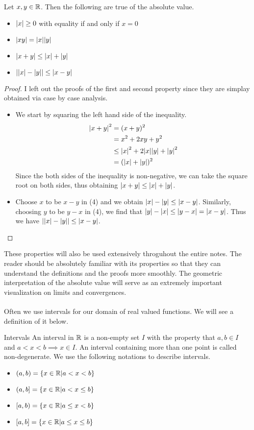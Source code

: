 \documentclass[a4paper]{article}
\begin{document}
\begin{prp}{}{} Let $x,y\in\mathbb{R}$. Then the following are true of the absolute value. 
\begin{itemize}
\item $\abs{x}\geq 0$ with equality if and only if $x=0$
\item $\abs{xy}=\abs{x}\abs{y}$
\item $\abs{x+y}\leq\abs{x}+\abs{y}$
\item $\abs{\abs{x}-\abs{y}}\leq\abs{x-y}$
\end{itemize}\tcbline
\begin{proof} I left out the proofs of the first and second property since they are simplay obtained via case by case analysis. 
\begin{itemize}
\item We start by squaring the left hand side of the inequality. 
\begin{align*}
\abs{x+y}^2&=(x+y)^2 \\
&=x^2+2xy+y^2 \\
&\leq \abs{x}^2+2\abs{x}\abs{y}+\abs{y}^2 \\
&=(\abs{x}+\abs{y})^2
\end{align*}
Since the both sides of the inequality is non-negative, we can take the square root on both sides, thus obtaining $\abs{x+y}\leq\abs{x}+\abs{y}$. 
\item Choose $x$ to be $x-y$ in (4) and we obtain $\abs{x}-\abs{y}\leq\abs{x-y}$. Similarly, choosing $y$ to be $y-x$ in (4), we find that $\abs{y}-\abs{x}\leq\abs{y-x}=\abs{x-y}$. Thus we have $\abs{\abs{x}-\abs{y}}\leq\abs{x-y}$. 
\end{itemize}
\end{proof}
\end{prp}

These properties will also be used extensively throguhout the entire notes. The reader should be absolutely familiar with its properties so that they can understand the definitions and the proofs more smoothly. The geometric interpretation of the absolute value will serve as an extremely important visualization on limits and convergences. \\~\\

Often we use intervals for our domain of real valued functions. We will see a definition of it below. 

\begin{defn}{Intervals}{} An interval in $\mathbb{R}$ is a non-empty set $I$ with the property that $a,b\in I$ and $a<x<b\implies x\in I$. An interval containing more than one point is called non-degenerate. We use the following notations to describe intervals. 
\begin{itemize}
\item $(a,b)=\{x\in\mathbb{R}|a<x<b\}$
\item $(a,b]=\{x\in\mathbb{R}|a<x\leq b\}$
\item $[a,b)=\{x\in\mathbb{R}|a\leq x<b\}$
\item $[a,b]=\{x\in\mathbb{R}|a\leq x\leq b\}$
\end{itemize}
\end{defn}
\end{document}
